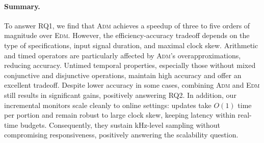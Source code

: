 \paragraph*{Summary.}
To answer RQ1, we find that \textsc{Adm} achieves a speedup of three to five orders of magnitude over \textsc{Edm}. However, the efficiency-accuracy tradeoff depends on the type of specifications, input signal duration, and maximal clock skew. Arithmetic and timed operators are particularly affected by \textsc{Adm}'s overapproximations, reducing accuracy. Untimed temporal properties, especially those without mixed conjunctive and disjunctive operations, maintain high accuracy and offer an excellent tradeoff. Despite lower accuracy in some cases, combining \textsc{Adm} and \textsc{Edm} still results in significant gains, positively answering RQ2.
In addition, our incremental monitors scale cleanly to online settings: updates take $O(1)$ time per portion and remain robust to large clock skew, keeping latency within real-time budgets. Consequently, they sustain kHz-level sampling without compromising responsiveness, positively answering the scalability question.

